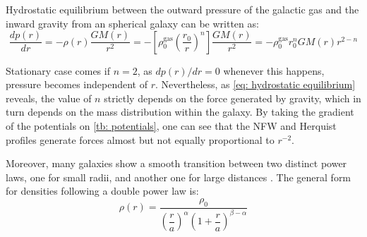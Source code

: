 		Hydrostatic equilibrium between the outward pressure of the galactic gas and the inward gravity from an spherical galaxy can be written as:
		\begin{equation}\label{eq: hydrostatic equilibrium}
			\dfrac{dp(r)}{dr} = -\rho(r)\dfrac{GM(r)}{r^2} = -\left[\rho_0^\text{gas}\left(\dfrac{r_0}{r}\right)^n\right]\dfrac{GM(r)}{r^2} = -\rho_0^\text{gas}r_0^nGM(r)r^{2-n}
		\end{equation}
		
		Stationary case comes if $n = 2$, as $dp(r) / dr = 0$ whenever this happens, pressure becomes independent of $r$. Nevertheless, as \autoref{eq: hydrostatic equilibrium} reveals, the value of $n$ strictly depends on the force generated by gravity, which in turn depends on the mass distribution within the galaxy. By taking the gradient of the potentials on \autoref{tb: potentials}, one can see that the NFW and Herquist profiles generate forces almost but not equally proportional to $r^{-2}$.
		
		Moreover, many galaxies show a smooth transition between two distinct power laws, one for small radii, and another one for large distances \cite{binney2011galactic}. The general form for densities following a double power law is:
		\begin{equation}
			\rho(r) = \dfrac{\rho_0}{\left(\dfrac{r}{a}\right) ^ \alpha \left(1 + \dfrac{r}{a}\right) ^ {\beta - \alpha}}
		\end{equation}
		
